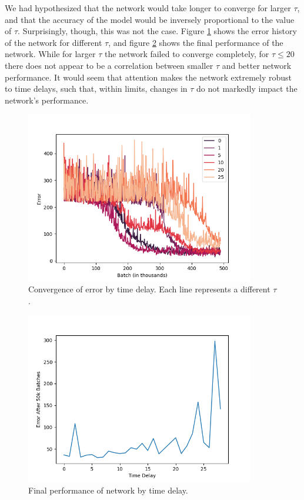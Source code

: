 \documentclass[12pt]{article}
\begin{document}
We had hypothesized that the network would take longer to converge for larger $\tau$, and that the accuracy of the model would be inversely proportional to the value of $\tau$. Surprisingly, though, this was not the case. Figure \ref{fig:tau_convergence_speed} shows the error history of the network for different $\tau$, and figure \ref{fig:tau_final_performance} shows the final performance of the network. While for larger $\tau$ the network failed to converge completely, for $\tau\leq 20$ there does not appear to be a correlation between smaller $\tau$ and better network performance. It would seem that attention makes the network extremely robust to time delays, such that, within limits, changes in $\tau$ do not markedly impact the network's performance.

\begin{figure}
	\includegraphics[width=10cm]{error_by_tau_figure}
	\centering
	\caption{Convergence of error by time delay. Each line represents a different $\tau$.}
	\label{fig:tau_convergence_speed}
\end{figure}

\begin{figure}
	\includegraphics[width=10cm]{final_performance_by_tau}\centering
	\caption{Final performance of network by time delay.}
	\label{fig:tau_final_performance}
\end{figure}
\end{document}
